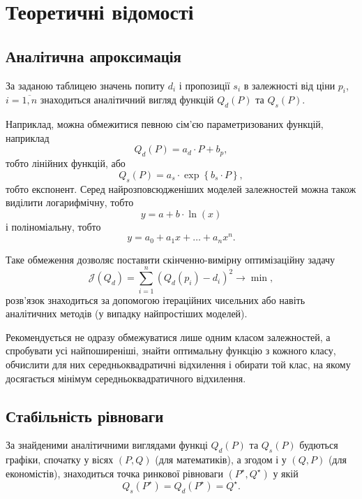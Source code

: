 




\tableofcontents

\section{Теоретичні відомості}

\subsection{Аналітична апроксимація}

За заданою таблицею значень попиту $d_i$ і пропозиції $s_i$ в залежності від ціни $p_i$, $i = \overline{1, n}$ знаходиться аналітичний вигляд функцій $Q_d(P)$ та $Q_s(P)$. \medskip

Наприклад, можна обмежитися певною сім'єю параметризованих функцій, наприклад \[ Q_d(P) = a_d \cdot P + b_p, \] тобто лінійних функцій, або \[ Q_s(P) = a_s \cdot \exp\left\{b_s \cdot P\right\}, \] тобто експонент. Серед найрозповсюдженіших моделей залежностей можна також виділити логарифмічну, тобто \[ y = a + b \cdot \ln(x) \] і поліноміальну, тобто \[ y = a_0 + a_1 x + \ldots + a_n x^n. \]

Таке обмеження дозволяє поставити скінченно-вимірну оптимізаційну задачу \[ \mathcal{J}(Q_d) = \sum_{i = 1}^n \left( Q_d(p_i) - d_i \right)^2 \to \min, \] розв'язок знаходиться за допомогою ітераційних чисельних або навіть аналітичних методів (у випадку найпростіших моделей). \medskip

Рекомендується не одразу обмежуватися лише одним класом залежностей, а спробувати усі найпоширеніші, знайти оптимальну функцію з кожного класу, обчислити для них середньоквадратичні відхилення і обирати той клас, на якому досягається мінімум середньоквадратичного відхилення.

\subsection{Стабільність рівноваги}

За знайденими аналітичними виглядами функці $Q_d(P)$ та $Q_s(P)$ будються графіки, спочатку у вісях $(P, Q)$ (для математиків), а згодом і у $(Q, P)$ (для економістів), знаходиться точка ринкової рівноваги $(P^\star, Q^\star)$ у якій \[ Q_s(P^\star) = Q_d(P^\star) = Q^\star. \]

